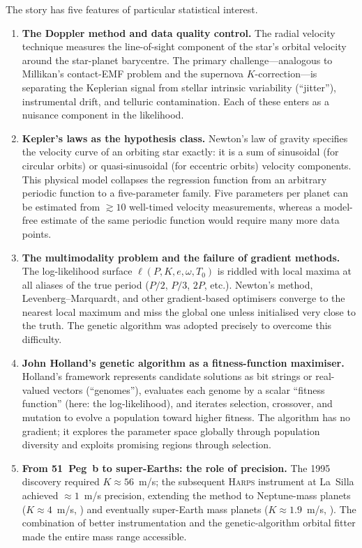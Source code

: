 \documentclass[12pt]{article}
\begin{document}
The story has five features of particular statistical interest.
\begin{enumerate}
  \item \textbf{The Doppler method and data quality control.}
    The radial velocity technique measures the line-of-sight component
    of the star's orbital velocity around the star-planet barycentre.
    The primary challenge---analogous to Millikan's contact-EMF problem
    and the supernova $K$-correction---is separating the Keplerian
    signal from stellar intrinsic variability (``jitter''), instrumental
    drift, and telluric contamination.  Each of these enters as a
    nuisance component in the likelihood.

  \item \textbf{Kepler's laws as the hypothesis class.}
    Newton's law of gravity specifies the velocity curve of an orbiting
    star exactly: it is a sum of sinusoidal (for circular orbits) or
    quasi-sinusoidal (for eccentric orbits) velocity components.  This
    physical model collapses the regression function from an arbitrary
    periodic function to a five-parameter family.  Five parameters per
    planet can be estimated from $\gtrsim 10$ well-timed velocity
    measurements, whereas a model-free estimate of the same
    periodic function would require many more data points.

  \item \textbf{The multimodality problem and the failure of gradient
    methods.}  The log-likelihood surface $\ell(P, K, e, \omega, T_0)$
    is riddled with local maxima at all aliases of the true period
    ($P/2$, $P/3$, $2P$, etc.).  Newton's method, Levenberg--Marquardt,
    and other gradient-based optimisers converge to the nearest local
    maximum and miss the global one unless initialised very close to
    the truth.  The genetic algorithm was adopted precisely to overcome
    this difficulty.

  \item \textbf{John Holland's genetic algorithm as a fitness-function
    maximiser.}  Holland's \citeyearpar{Holland1975} framework represents
    candidate solutions as bit strings or real-valued vectors (``genomes''),
    evaluates each genome by a scalar ``fitness function'' (here: the
    log-likelihood), and iterates selection, crossover, and mutation to
    evolve a population toward higher fitness.  The algorithm has no
    gradient; it explores the parameter space globally through
    population diversity and exploits promising regions through selection.

  \item \textbf{From 51~Peg~b to super-Earths: the role of precision.}
    The 1995 discovery required $K \approx 56$~m/s; the subsequent
    \textsc{Harps} instrument at La~Silla achieved $\approx 1$~m/s
    precision, extending the method to Neptune-mass planets
    ($K \approx 4$~m/s, \citealt{Pepe2004}) and eventually super-Earth
    mass planets ($K \approx 1.9$~m/s, \citealt{Mayor2009}).  The
    combination of better instrumentation and the genetic-algorithm
    orbital fitter made the entire mass range accessible.
\end{enumerate}
\end{document}
